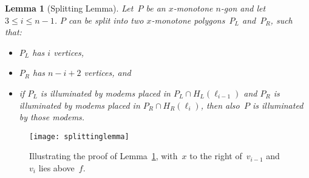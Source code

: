 \documentclass[A4]{article}
\newtheorem{lemma}[theorem]{Lemma}
\begin{document}
\begin{lemma}[Splitting Lemma]\label{lem:splitting} Let~$P$ be an $x$-monotone $n$-gon and let $3 \leq i \leq  n-1$.
$P$ can be split into two $x$-monotone polygons~$P_L$ and~$P_R$, such that:
  \begin{itemize}
  \item $P_L$ has $i$ vertices,
  \item $P_R$ has $n-i+2$ vertices, and
  \item if $P_L$ is illuminated by modems placed in $P_L\cap H_L(\ell_{i-1})$ and $P_R$ is illuminated by modems placed in $P_R\cap H_R(\ell_{i})$, then also~$P$ is illuminated by those modems.
  \end{itemize}
\end{lemma}

\begin{figure}[htb]
  \centering
  \texttt{[image: splittinglemma]}
  \caption{Illustrating the proof of Lemma~\ref{lem:splitting}, with~$x$ to the right of~$v_{i-1}$ and~$v_i$ lies above~$f$.}
  \label{fig:splittinglemma1}
\end{figure}
\end{document}
